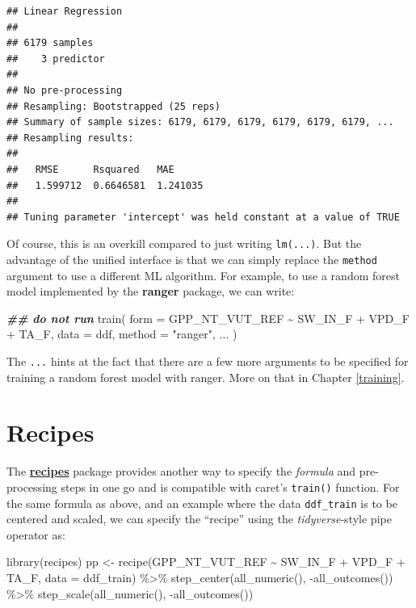 \documentclass[
]{book}
\newenvironment{Shaded}{\begin{snugshade}}{\end{snugshade}}
\newcommand{\AttributeTok}[1]{\textcolor[rgb]{0.77,0.63,0.00}{#1}}
\newcommand{\DocumentationTok}[1]{\textcolor[rgb]{0.56,0.35,0.01}{\textbf{\textit{#1}}}}
\newcommand{\FunctionTok}[1]{\textcolor[rgb]{0.00,0.00,0.00}{#1}}
\newcommand{\NormalTok}[1]{#1}
\newcommand{\OtherTok}[1]{\textcolor[rgb]{0.56,0.35,0.01}{#1}}
\newcommand{\SpecialCharTok}[1]{\textcolor[rgb]{0.00,0.00,0.00}{#1}}
\newcommand{\StringTok}[1]{\textcolor[rgb]{0.31,0.60,0.02}{#1}}
\begin{document}
\begin{verbatim}
## Linear Regression 
## 
## 6179 samples
##    3 predictor
## 
## No pre-processing
## Resampling: Bootstrapped (25 reps) 
## Summary of sample sizes: 6179, 6179, 6179, 6179, 6179, 6179, ... 
## Resampling results:
## 
##   RMSE      Rsquared   MAE     
##   1.599712  0.6646581  1.241035
## 
## Tuning parameter 'intercept' was held constant at a value of TRUE
\end{verbatim}

Of course, this is an overkill compared to just writing \texttt{lm(...)}. But the advantage of the unified interface is that we can simply replace the \texttt{method} argument to use a different ML algorithm. For example, to use a random forest model implemented by the \textbf{ranger} package, we can write:

\begin{Shaded}
\begin{Highlighting}[]
\DocumentationTok{\#\# do not run}
\FunctionTok{train}\NormalTok{(}
  \AttributeTok{form =}\NormalTok{ GPP\_NT\_VUT\_REF }\SpecialCharTok{\textasciitilde{}}\NormalTok{ SW\_IN\_F }\SpecialCharTok{+}\NormalTok{ VPD\_F }\SpecialCharTok{+}\NormalTok{ TA\_F, }
  \AttributeTok{data =}\NormalTok{ ddf, }
  \AttributeTok{method =} \StringTok{"ranger"}\NormalTok{,}
\NormalTok{  ...}
\NormalTok{)}
\end{Highlighting}
\end{Shaded}

The \texttt{...} hints at the fact that there are a few more arguments to be specified for training a random forest model with ranger. More on that in Chapter \ref{training}.

\hypertarget{recipes}{%
\section{Recipes}\label{recipes}}

The \href{https://recipes.tidymodels.org/}{\textbf{recipes}} package provides another way to specify the \emph{formula} and pre-processing steps in one go and is compatible with caret's \texttt{train()} function. For the same formula as above, and an example where the data \texttt{ddf\_train} is to be centered and scaled, we can specify the ``recipe'' using the \emph{tidyverse}-style pipe operator as:

\begin{Shaded}
\begin{Highlighting}[]
\FunctionTok{library}\NormalTok{(recipes)}
\NormalTok{pp }\OtherTok{\textless{}{-}} \FunctionTok{recipe}\NormalTok{(GPP\_NT\_VUT\_REF }\SpecialCharTok{\textasciitilde{}}\NormalTok{ SW\_IN\_F }\SpecialCharTok{+}\NormalTok{ VPD\_F }\SpecialCharTok{+}\NormalTok{ TA\_F, }\AttributeTok{data =}\NormalTok{ ddf\_train) }\SpecialCharTok{\%\textgreater{}\%} 
  \FunctionTok{step\_center}\NormalTok{(}\FunctionTok{all\_numeric}\NormalTok{(), }\SpecialCharTok{{-}}\FunctionTok{all\_outcomes}\NormalTok{()) }\SpecialCharTok{\%\textgreater{}\%}
  \FunctionTok{step\_scale}\NormalTok{(}\FunctionTok{all\_numeric}\NormalTok{(), }\SpecialCharTok{{-}}\FunctionTok{all\_outcomes}\NormalTok{())}
\end{Highlighting}
\end{Shaded}
\end{document}
